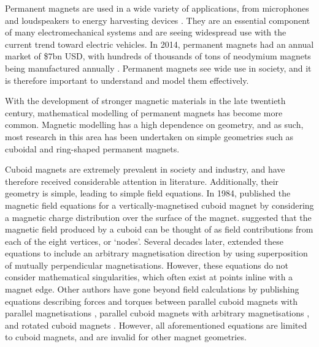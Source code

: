 Permanent magnets are used in a wide variety of applications, from microphones and loudspeakers to energy harvesting devices \cite{Coey2002}. They are an essential component of many electromechanical systems and are seeing widespread use with the current trend toward electric vehicles. In 2014, permanent magnets had an annual market of \$7bn USD, with hundreds of thousands of tons of neodymium magnets being manufactured annually \cite{Coey2014}. Permanent magnets see wide use in society, and it is therefore important to understand and model them effectively.

With the development of stronger magnetic materials in the late twentieth century, mathematical modelling of permanent magnets has become more common. Magnetic modelling has a high dependence on geometry, and as such, most research in this area has been undertaken on simple geometries such as cuboidal and ring-shaped permanent magnets.

Cuboid magnets are extremely prevalent in society and industry, and have therefore received considerable attention in literature. Additionally, their geometry is simple, leading to simple field equations. In 1984, \textcite{Akoun1984} published the magnetic field equations for a vertically-magnetised cuboid magnet by considering a magnetic charge distribution over the surface of the magnet. \textcite{Bancel1999} suggested that the magnetic field produced by a cuboid can be thought of as field contributions from each of the eight vertices, or `nodes'. Several decades later, \textcite{Ravaud2009} extended these equations to include an arbitrary magnetisation direction by using superposition of mutually perpendicular magnetisations. However, these equations do not consider mathematical singularities, which often exist at points inline with a magnet edge. Other authors have gone beyond field calculations by publishing equations describing forces and torques between parallel cuboid magnets with parallel magnetisations \cite{Akoun1984,Allag2009}, parallel cuboid magnets with arbitrary magnetisations \cite{Janssen2011}, and rotated cuboid magnets \cite{Dam2016}. However, all aforementioned equations are limited to cuboid magnets, and are invalid for other magnet geometries.

